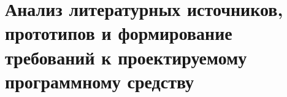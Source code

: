 \section{Анализ литературных источников, прототипов и формирование
требований к проектируемому программному средству}
\label{sec:analysis}